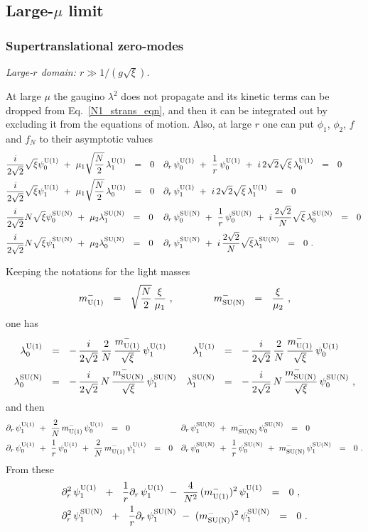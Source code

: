 \documentclass{article}
\newcommand{\p}{\partial}
\newcommand{\mUm}{m_{\rm U(1)}^{-}}
\newcommand{\mNm}{m_{\rm SU(N)}^{-}}
\begin{document}
\pagebreak
\subsection{Large-$\mu$ limit}

\subsubsection{Supertranslational zero-modes}

{\it Large-$r$ domain: $ r \gg 1/(g\sqrt{\xi}) $.}

At large $ \mu $ the gaugino $ \lambda^2 $ does not propagate and its kinetic terms can be dropped from Eq.~\eqref{N1_strans_eqn},
and then it can be integrated out by excluding it from the equations of motion.
Also, at large $ r $ one can put $ \phi_1 $, $\phi_2 $, $ f $ and $ f_N $ to their asymptotic values
\begin{align*}
%
& 
	\frac{i}{2\sqrt{2}} \sqrt{\xi} \poU ~+~ \mu_1 \sqrt{\frac{N}{2}}\, \llU ~~=~~ 0   
&&
	\p_r \,\poU ~+~ \frac{1}{r}\,\poU ~+~ i\, 2\sqrt{2}\sqrt{\xi}\, \loU ~~=~~ 0 
\\
%
& 
	\frac{i}{2\sqrt{2}} \sqrt{\xi} \plU ~+~ \mu_1 \sqrt{\frac{N}{2}}\, \loU ~~=~~ 0   
&&
	\p_r \, \plU ~+~ i\,2\sqrt{2}\sqrt{\xi}\,\llU ~~=~~ 0
\\
%
&
	\frac{i}{2\sqrt{2}} N\sqrt{\xi} \poN ~+~ \mu_2 \llN ~~=~~ 0  
&&
	\p_r \,\poN ~+~ \frac{1}{r}\, \poN ~+~ i\,\frac{2\sqrt{2}}{N} \sqrt{\xi}\, \loN ~~=~~ 0\,
\\
%
&
	\frac{i}{2\sqrt{2}} N\sqrt{\xi} \plN ~+~ \mu_2 \loN ~~=~~ 0
&&
	\p_r \,\plN ~+~ i\,\frac{2\sqrt{2}}{N}\sqrt{\xi} \llN ~~=~~ 0~.
\end{align*}

Keeping the notations for the light masses
\[
	\mUm ~~=~~ \sqrt{\frac{N}{2}}\, \frac{\xi}{\mu_1}~,  \qquad\qquad \mNm ~~=~~ \frac{\xi}{\mu_2}~,
\]
one has
\begin{align*}
%
	\loU & ~~=~~ -\, \frac{i}{2\sqrt{2}}\, \frac{2}{N}\, \frac{\mUm}{\sqrt{\xi}}\, \plU 
&
	\llU & ~~=~~ -\, \frac{i}{2\sqrt{2}}\, \frac{2}{N}\, \frac{\mUm}{\sqrt{\xi}}\, \poU \\
%
	\loN & ~~=~~ -\, \frac{i}{2\sqrt{2}}\, N\, \frac{\mNm}{\sqrt{\xi}}\, \plN
&
	\llN & ~~=~~ -\, \frac{i}{2\sqrt{2}}\, N\, \frac{\mNm}{\sqrt{\xi}}\, \poN ~,
\end{align*}
and then 
\begin{align*}
%
	& \p_r\, \plU ~+~ \frac{2}{N}\,\mUm\,\poU ~~=~~ 0
	&& \p_r\, \plN ~+~ \mNm\,\poN ~~=~~ 0
\\
%
	& \p_r\, \poU ~+~ \frac{1}{r}\,\poU ~+~ \frac{2}{N}\,\mUm\,\plU ~~=~~ 0
	&& \p_r\, \poN ~+~ \frac{1}{r}\,\poN ~+~ \mNm\,\plN ~~=~~ 0~.
%
\end{align*}
From these
\begin{align*}
%
	& \p_r^2\, \plU  ~~+~~ \frac{1}{r}\p_r\, \plU ~-~ \frac{4}{N^2}\,(\mUm)^2\, \plU  ~~=~~ 0~, \\
%
	& \p_r^2\, \plN  ~~+~~ \frac{1}{r}\p_r\, \plN ~-~ (\mNm)^2\, \plN ~~=~~ 0~.
\end{align*}
\end{document}
